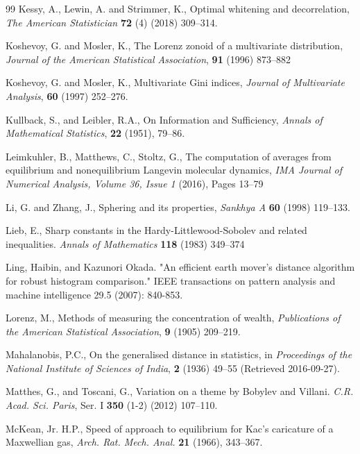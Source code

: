 \documentclass{article}
\begin{document}
\begin{thebibliography}{99}
Kessy, A.,  Lewin, A. and  Strimmer, K.,   Optimal whitening and decorrelation, 
\emph{The American Statistician} \textbf{72} (4) (2018) 309--314.


Koshevoy, G. and Mosler, K.,  The Lorenz zonoid of a multivariate distribution, \textit{Journal of the American Statistical Association}, \textbf{91}  (1996) 873--882

Koshevoy, G. and Mosler, K.,  Multivariate Gini indices, \textit{Journal of Multivariate Analysis}, \textbf{60}  (1997) 252--276.

Kullback, S., and  Leibler, R.A., On Information and Sufficiency, \emph{Annals of Mathematical Statistics}, \textbf{22} (1951), 79--86.

Leimkuhler, B., Matthews, C., Stoltz, G., The computation of averages from equilibrium and nonequilibrium Langevin molecular dynamics, \emph{IMA Journal of Numerical Analysis, Volume 36, Issue 1} (2016), Pages 13–79

Li, G. and Zhang, J., Sphering and its properties, \emph{Sankhya A} \textbf{60} (1998)  119--133. 

Lieb, E., Sharp constants in the Hardy-Littlewood-Sobolev and related
inequalities. \textit{Annals of Mathematics}  \textbf{118} (1983) 349--374


Ling, Haibin, and Kazunori Okada. "An efficient earth mover's distance algorithm for robust histogram comparison." IEEE transactions on pattern analysis and machine intelligence 29.5 (2007): 840-853.


Lorenz, M.,  Methods of measuring the concentration of wealth, \textit{Publications of the American Statistical Association}, \textbf{9}  (1905)  209--219. 

Mahalanobis, P.C.,  On the generalised distance in statistics, in \textit{Proceedings of the National Institute of Sciences of India}, \textbf{2}  (1936) 49--55 (Retrieved 2016-09-27).



Matthes, G., and Toscani, G., Variation on a theme by Bobylev and Villani. \emph{C.R. Acad. Sci. Paris}, Ser. I \textbf{350} (1-2) (2012) 107--110.

McKean, Jr. H.P., Speed of approach to equilibrium for Kac’s caricature of a Maxwellian gas, \emph{Arch. Rat. Mech. Anal.} \textbf{21} (1966), 343--367.


\end{thebibliography}
\end{document}
